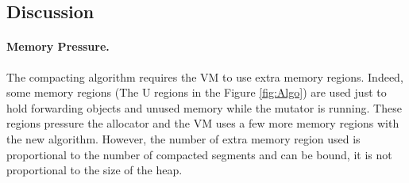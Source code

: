 \documentclass[sigplan,10pt,screen]{acmart}\settopmatter{printfolios=true,printccs=true,printacmref=true}
\newcommand{\todo}[1]{\color{orange}\fbox{\bfseries\sffamily\scriptsize TODO:}{\sf\small$\blacktriangleright$\textit{#1}$\blacktriangleleft$}\color{black}}
\newcommand{\eem}[1]{\color{olive}\fbox{\bfseries\sffamily\scriptsize Eliot:}{\sf\small$\blacktriangleright$\textit{#1}$\blacktriangleleft$}\color{black}}
\def\OpenSmalltalkVM{OpenSmalltalk-VM\xspace}
\begin{document}
\subsection{Discussion}
\label{sec:discussion}



\paragraph{Memory Pressure.}
The compacting algorithm requires the VM to use extra memory regions. Indeed, some memory regions (The U regions in the Figure \ref{fig:Algo}) are used just to hold forwarding objects and unused memory while the mutator is running. These regions pressure the allocator and the VM uses a few more memory regions with the new algorithm. However, the number of extra memory region used is proportional to the number of compacted segments and can be bound, it is not proportional to the size of the heap. %

\end{document}
